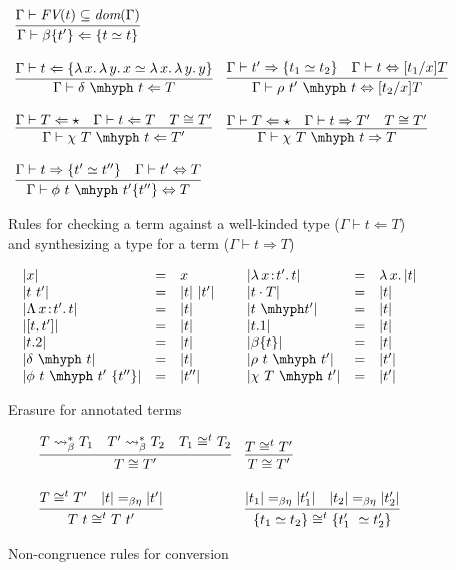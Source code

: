 \documentclass{article}
\newcommand{\abs}[4]{{#1}\, #2\! : \! #3.\, #4}
\newcommand{\absu}[3]{{#1}\, #2.\, #3}
\newcommand{\tpcheck}[0]{\Leftarrow}
\newcommand{\tpsynth}[0]{\Rightarrow}
\begin{document}
\begin{figure}
\[\begin{array}{ll}
    \infer{\Gamma\vdash \beta\{t'\} \tpcheck \{ t \simeq t \}}{\Gamma\vdash \textit{FV}(t)\subseteq \textit{dom}(\Gamma)}  \\ \\    
    \infer{\Gamma\vdash \delta\ \mhyph\ t \tpcheck T}{\Gamma\vdash t\tpcheck \{ \absu{\lambda}{x}{\absu{\lambda}{y}{x}} \simeq \absu{\lambda}{x}{\absu{\lambda}{y}{y}}\}}  &
    \infer{\Gamma\vdash \rho\ t'\ \mhyph\ t \Leftrightarrow [t_2/x]T}
          {\Gamma\vdash t' \tpsynth \{ t_1 \simeq t_2 \} & \Gamma \vdash t \Leftrightarrow [t_1/x]T} \\ \\
    \infer{\Gamma\vdash \chi\ T\ \mhyph\ t \tpcheck T'}
          {\Gamma\vdash T\tpcheck \star & \Gamma\vdash t \tpcheck T & T \cong T'} &
    \infer{\Gamma\vdash \chi\ T\ \mhyph\ t \tpsynth T}
          {\Gamma\vdash T\tpcheck \star & \Gamma\vdash t \tpsynth T' & T \cong T'} \\ \\
    \infer{\Gamma\vdash \phi\ t\ \mhyph\ t'\{t''\} \Leftrightarrow T}
          {\Gamma\vdash t\tpsynth \{t'\simeq t''\} & \Gamma\vdash t' \Leftrightarrow T}  & \
  \end{array}
  \]
\caption{Rules for checking a term against a well-kinded type ($\Gamma \vdash t \tpcheck T$)
           and synthesizing a type for a term ($\Gamma \vdash t \tpsynth T$)}
\label{fig:tp}
\end{figure}


\begin{figure}
  \[
  \begin{array}{lllllll}
    |x| & = & x &\ &
    |\abs{\lambda}{x}{t'}{t}| & = & \absu{\lambda}{x}{|t|} \\
    |t\ t'| & = & |t|\ |t'| &\ &
    |t\cdot T| & = & |t| \\
    |\abs{\Lambda}{x}{t'}{t}| & = & |t| &\ &
    |t\ \mhyph t'| & = & |t| \\
    |[t , t']| & = & |t| &\ &
    |t.1| & = & |t| \\
    |t.2| & = & |t| &\ &
    |\beta\{t\}| & = & |t|\\
    |\delta\ \mhyph\ t| & = & |t|&\ &
    |\rho\ t\ \mhyph\ t'| & = & |t'| \\
    |\phi\ t\ \mhyph\ t'\ \{t''\}| & = & |t''| &\ &
    |\chi\ T\ \mhyph\ t'| & = & |t'|
  \end{array}
  \]
  \caption{Erasure for annotated terms}
  \label{fig:eraser}
\end{figure}  

\begin{figure}
  \[
  \begin{array}{ll}
    \infer{T \cong T'}{T \leadsto^*_\beta T_1 & T' \leadsto^*_\beta T_2 & T_1\cong^t T_2}  & 
    \infer{T \cong T'}{T \cong^t T'} \\ \\
    \infer{T\ t \cong^t T\ t'}{T \cong^t T' & |t| =_{\beta\eta} |t'|} &
    \infer{\{ t_1 \simeq t_2 \} \cong^t \{ t_1'\ \simeq t_2' \}}{|t_1| =_{\beta\eta} |t_1'| & |t_2| =_{\beta\eta} |t_2'|}
  \end{array}
  \]
  \caption{Non-congruence rules for conversion}
  \label{fig:conv}
\end{figure}  
\end{document}
